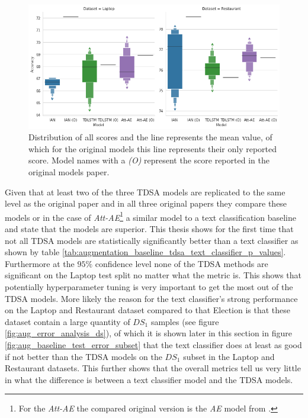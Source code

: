 \begin{figure}[ht!]
    \centering
    \includegraphics[scale=0.5]{images/augmentation/methods_performance/baseline/replication_experiment_baseline.png}
    \caption{Distribution of all scores and the line represents the mean value, of which for the original models this line represents their only reported score. Model names with a \textit{(O)} represent the score reported in the original models paper.}
    \label{fig:aug_baseline_replication_scores}
\end{figure}

Given that at least two of the three TDSA models are replicated to the same level as the original paper and in all three original papers they compare these models or in the case of \textit{Att-AE}\footnote{For the \textit{Att-AE} the compared original version is the \textit{AE} model from \citet{wang-etal-2016-attention}.} a similar model to a text classification baseline and state that the models are superior. This thesis shows for the first time that not all TDSA models are statistically significantly better than a text classifier as shown by table \ref{tab:augmentation_baseline_tdsa_text_classifier_p_values}. Furthermore at the $95\%$ confidence level none of the TDSA methods are significant on the Laptop test split no matter what the metric is. This shows that potentially hyperparameter tuning is very important to get the most out of the TDSA models. More likely the reason for the text classifier's strong performance on the Laptop and Restaurant dataset compared to that Election is that these dataset contain a large quantity of $DS_1$ samples (see figure \ref{fig:aug_error_analysis_ds}), of which it is shown later in this section in figure \ref{fig:aug_baseline_test_error_subset} that the text classifier does at least as good if not better than the TDSA models on the $DS_1$ subset in the Laptop and Restaurant datasets. This further shows that the overall metrics tell us very little in what the difference is between a text classifier model and the TDSA models.  



